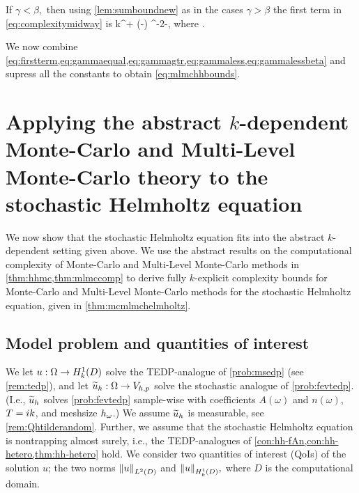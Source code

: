 If $\gamma < \beta,$ then using \cref{lem:sumboundnew} as in the cases $\gamma > \beta$ the first term in \eqref{eq:complexitymidway} is
\beq\label{eq:gammalessbeta}
\Cgammalessbeta k^{\tau + \mleft(\gamma-\beta\mright)\frac\sigma\alpha} \eps^{-2-\frac{\gamma-\beta}{\alpha}},
\eeq
where
\beq\label{eq:gammaless}
\Cgammalessbeta \de {}.
\eeq

We now combine \cref{eq:firstterm,eq:gammaequal,eq:gammagtr,eq:gammaless,eq:gammalessbeta} and supress all the constants to obtain \cref{eq:mlmchhbounds}.
\epf



\section{Applying the abstract $k$-dependent Monte-Carlo and Multi-Level Monte-Carlo theory to the stochastic Helmholtz equation}\label{sec:mlmcapplying}

We now show that the stochastic Helmholtz equation fits into the abstract $k$-dependent setting given above. We use the abstract results on the computational complexity of Monte-Carlo and Multi-Level Monte-Carlo methods in \cref{thm:hhmc,thm:mlmccomp} to derive fully $k$-explicit complexity bounds for Monte-Carlo and Multi-Level Monte-Carlo methods for the stochastic Helmholtz equation, given in \cref{thm:mcmlmchelmholtz}.

\subsection{Model problem and quantities of interest}\label{sec:mlmcmodel}

We let $u:\Omega\rightarrow\HokD$ solve the TEDP-analogue of \cref{prob:msedp} (see \cref{rem:tedp}), and let $\widetilde{u}_{h}:\Omega\rightarrow V_{h,p}$ solve the stochastic analogue of \cref{prob:fevtedp}. (I.e., $\widetilde{u}_{h}$ solves \cref{prob:fevtedp} sample-wise with coefficients $A(\omega)$ and $n(\omega)$, $T = ik$, and meshsize $h_{\omega}$.) We assume $\widetilde{u}_{h}$ is measurable, see \cref{rem:Qhtilderandom}. Further, we assume that the stochastic Helmholtz equation is nontrapping almost surely, i.e., the TEDP-analogues of \cref{con:hh-fAn,con:hh-hetero,thm:hh-hetero} hold. We consider two quantities of interest (QoIs) of the solution $u$; the two norms $\NLtD{u}$ and $\NHokD{u},$ where $D$ is the computational domain.

